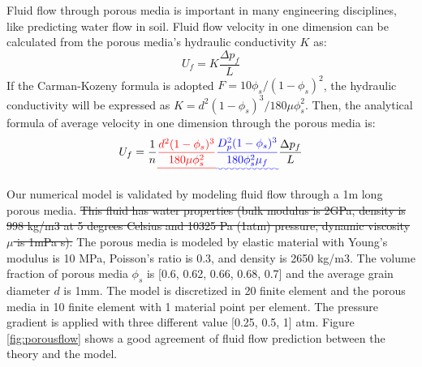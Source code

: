 \documentclass[preprint,12pt]{elsarticle}
\providecommand{\DIFadd}[1]{{\protect\color{blue}\uwave{#1}}} %
\providecommand{\DIFdel}[1]{{\protect\color{red}\sout{#1}}}                      %
\providecommand{\DIFaddbegin}{} %
\providecommand{\DIFaddend}{} %
\providecommand{\DIFdelbegin}{} %
\providecommand{\DIFdelend}{} %
\newcommand{\DIFscaledelfig}{0.5}
\newlength{\DIFdelgraphicswidth} %
\newlength{\DIFdelgraphicsheight} %
\newcommand{\DIFaddincludegraphics}[2][]{{\color{blue}\fbox{\DIFOincludegraphics[#1]{#2}}}} %
\newcommand{\DIFdelincludegraphics}[2][]{%
\sbox{\DIFdelgraphicsbox}{\DIFOincludegraphics[#1]{#2}}%
\settoboxwidth{\DIFdelgraphicswidth}{\DIFdelgraphicsbox} %
\settoboxtotalheight{\DIFdelgraphicsheight}{\DIFdelgraphicsbox} %
\scalebox{\DIFscaledelfig}{%
\parbox[b]{\DIFdelgraphicswidth}{\usebox{\DIFdelgraphicsbox}\\[-\baselineskip] \rule{\DIFdelgraphicswidth}{0em}}\llap{\resizebox{\DIFdelgraphicswidth}{\DIFdelgraphicsheight}{%
\setlength{\unitlength}{\DIFdelgraphicswidth}%
\begin{picture}(1,1)%
\thicklines\linethickness{2pt} %
{\color[rgb]{1,0,0}\put(0,0){\framebox(1,1){}}}%
{\color[rgb]{1,0,0}\put(0,0){\line( 1,1){1}}}%
{\color[rgb]{1,0,0}\put(0,1){\line(1,-1){1}}}%
\end{picture}%
}\hspace*{3pt}}} %
} %
\DeclareRobustCommand{\DIFaddbegin}{\DIFOaddbegin \let\includegraphics\DIFaddincludegraphics} %
\DeclareRobustCommand{\DIFaddend}{\DIFOaddend \let\includegraphics\DIFOincludegraphics} %
\DeclareRobustCommand{\DIFdelbegin}{\DIFOdelbegin \let\includegraphics\DIFdelincludegraphics} %
\DeclareRobustCommand{\DIFdelend}{\DIFOaddend \let\includegraphics\DIFOincludegraphics} %
\begin{document}
%
%
Fluid flow through porous media is important in many engineering disciplines, like predicting water flow in soil. Fluid flow velocity in one dimension can be calculated from the porous media's hydraulic conductivity $K$ as:\\
%
%
\begin{equation}
  {U}_f   = K \frac{\Delta p_f}{L}
\end {equation}
%
%
If the Carman-Kozeny formula is adopted $F = 10\phi_s/(1-\phi_s)^2$, the hydraulic conductivity will be expressed as  \DIFdelbegin \DIFdel{$K = d^2 (1-\phi_s)^3 / 180 \mu \phi_s^2$}\DIFdelend \DIFaddbegin \DIFadd{$K = D_p^2 (1-\phi_s)^3 \rho_f  g / 180 \phi_s^2  \mu_f $}\DIFaddend . Then, the analytical formula of average velocity in one dimension through the porous media is:\\
%
%
\begin{equation}
  {U}_f  = \frac{1}{n} \DIFdelbegin \DIFdel{\frac{d^2 (1-\phi_s)^3}{180 \mu \phi_s^2} }\DIFdelend \DIFaddbegin \DIFadd{\frac{D_p^2 (1-\phi_s)^3}{180 \phi_s^2 \mu_f} }\DIFaddend \frac{\Delta p_f}{L}
\end {equation}

%
%
Our numerical model is validated by modeling fluid flow through a 1m long porous media. \DIFdelbegin \DIFdel{This fluid has water properties (bulk modulus is 2GPa, density is 998 kg/m3 at 5 degrees Celsius and 10325 Pa (1atm) pressure, dynamic viscosity $\mu$ is 1mPa s). }\DIFdelend The porous media is modeled by elastic material with Young's modulus is 10 MPa, Poisson's ratio is 0.3, and density is 2650 kg/m3. The volume fraction of porous media $\phi_s$ is [0.6, 0.62, 0.66, 0.68, 0.7] and the average grain diameter $d$ is 1mm. The model is discretized in 20 finite element and the porous media in 10 finite element with 1 material point per element. The pressure gradient is applied with three different value [0.25, 0.5, 1] atm. Figure \ref{fig:porousflow} shows a good agreement of fluid flow prediction between the theory and the model.
\DIFdelbegin %
\DIFdelend %
\end{document}
